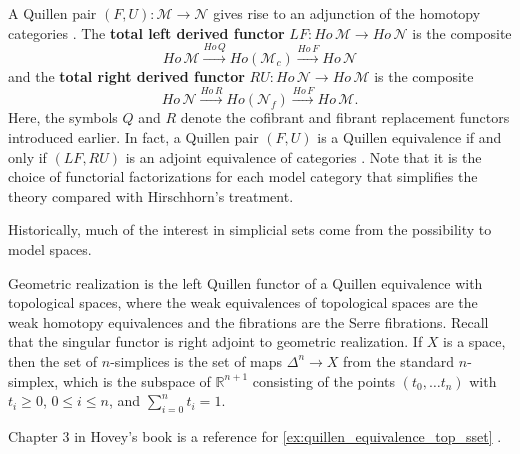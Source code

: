 A Quillen pair $(F,U):\mathscr{M} \to \mathscr{N}$ gives rise to an adjunction \cite[Sec.~1.3, pp.~16--19]{Ho99} of the homotopy categories \cite[Sec.~1.2, pp.~7--13]{Ho99}. The \textbf{total left derived functor} $LF:Ho\, \mathscr{M} \to Ho\, \mathscr{N}$ is the composite
\[Ho\, \mathscr{M} \xrightarrow{Ho\, Q} Ho(\mathscr{M} _c)\xrightarrow{Ho\, F} Ho\, \mathscr{N}\]
and the \textbf{total right derived functor} $RU:Ho\, \mathscr{N} \to Ho\, \mathscr{M}$ is the composite
\[Ho\, \mathscr{N} \xrightarrow{Ho\, R} Ho(\mathscr{N} _f)\xrightarrow{Ho\, F} Ho\, \mathscr{M} .\]
Here, the symbols $Q$ and $R$ denote the cofibrant and fibrant replacement functors introduced earlier. In fact, a Quillen pair $(F,U)$ is a Quillen equivalence if and only if $(LF,RU)$ is an adjoint equivalence of categories \cite[Prop.~1.3.13, p.~19]{Ho99}. Note that it is the choice of functorial factorizations for each model category that simplifies the theory compared with Hirschhorn's treatment.

Historically, much of the interest in simplicial sets come from the possibility to model spaces. 
\begin{example}\label{ex:quillen_equivalence_top_sset}
Geometric realization is the left Quillen functor of a Quillen equivalence with topological spaces, where the weak equivalences of topological spaces are the weak homotopy equivalences and the fibrations are the Serre fibrations. Recall that the singular functor is right adjoint to geometric realization. If $X$ is a space, then the set of $n$-simplices is the set of maps $\Delta ^n\to X$ from the standard $n$-simplex, which is the subspace of $\mathbb{R} ^{n+1}$ consisting of the points $(t_0,\dots t_n)$ with $t_i\geq 0$, $0\leq i\leq n$, and $\sum \limits _{i=0}^nt_i=1$.
\end{example}
\noindent Chapter 3 in Hovey's book is a reference for \cref{ex:quillen_equivalence_top_sset} \cite[pp.~73-100]{Ho99}.

